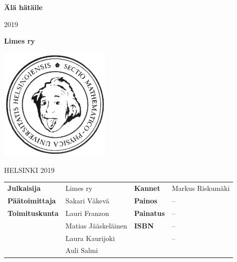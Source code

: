 \documentclass[a5paper, 8pt, twocolumn]{book} %
\numberwithin{equation}{section}
\begin{document}
\begin{titlepage}
	\begin{center}
		\vspace*{1cm}
		
		\Huge \textbf{Älä hätäile}
		
		\vspace{0.5cm}
		\Large 2019
		
		\vspace{1.5cm}
		
		\Large \textbf{Limes ry}
		
		\vfill

		\vspace{0.6cm}
		
		\includegraphics[width=0.4\textwidth]{einstein.png}
		
		HELSINKI 2019
	\end{center}
\end{titlepage}
\noindent%
	\begin{tabularx}{\textwidth}{@{}llll}
	\textbf{Julkaisija} & Limes ry & \textbf{Kannet} & Markus Riskumäki\\
	\textbf{Päätoimittaja} & Sakari Väkevä & \textbf{Painos} & -- \\
	\textbf{Toimituskunta} & Lauri Franzon & \textbf{Painatus} & -- \\
	& Matias Jääskeläinen & \textbf{ISBN} & -- \\
    & Laura Kaurijoki & & -- \\ & Auli Salmi & &
\end{tabularx}

\noindent{}
\end{document}
